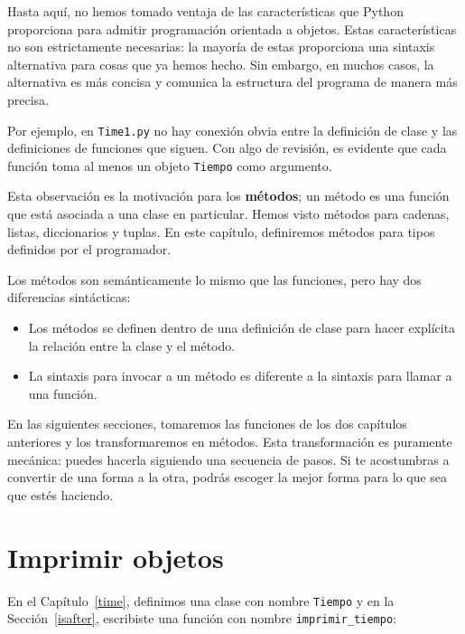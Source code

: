\documentclass[10pt]{book}
\begin{document}
Hasta aquí, no hemos tomado ventaja de las características que Python proporciona para
admitir programación orientada a objetos.  Estas características
no son estrictamente necesarias: la mayoría de estas proporciona
una sintaxis alternativa para cosas que ya hemos hecho.  Sin embargo, en muchos casos,
la alternativa es más concisa y comunica la estructura del programa
de manera más precisa.

Por ejemplo, en {\tt Time1.py} no hay conexión
obvia entre la definición de clase y las definiciones de funciones
que siguen.  Con algo de revisión, es evidente que cada función
toma al menos un objeto {\tt Tiempo} como argumento.

Esta observación es la motivación para los {\bf métodos}; un método es
una función que está asociada a una clase en particular.
Hemos visto métodos para cadenas, listas, diccionarios y tuplas.
En este capítulo, definiremos métodos para tipos definidos por el programador.

Los métodos son semánticamente lo mismo que las funciones, pero hay
dos diferencias sintácticas:

\begin{itemize}

\item Los métodos se definen dentro de una definición de clase para
hacer explícita la relación entre la clase y el método.

\item La sintaxis para invocar a un método es diferente a la
sintaxis para llamar a una función.

\end{itemize}

En las siguientes secciones, tomaremos las funciones de los dos
capítulos anteriores y los transformaremos en métodos.  Esta transformación es
puramente mecánica: puedes hacerla siguiendo una secuencia de
pasos.  Si te acostumbras a convertir de una forma a la otra,
podrás escoger la mejor forma para lo que sea que estés haciendo.


\section{Imprimir objetos}

En el Capítulo~\ref{time}, definimos una clase con nombre
{\tt Tiempo} y en la Sección~\ref{isafter}, escribiste
una función con nombre \verb"imprimir_tiempo":
\end{document}
